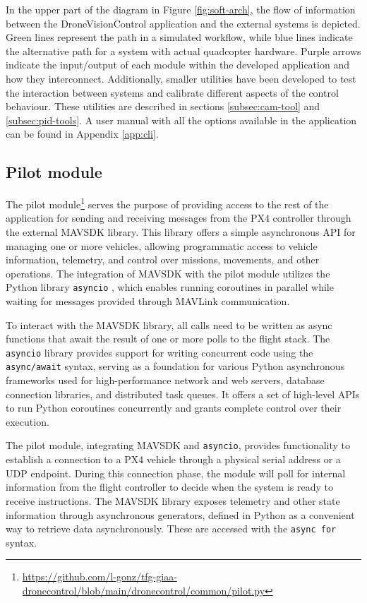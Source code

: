 In the upper part of the diagram in Figure \ref{fig:soft-arch}, the flow of information between the DroneVisionControl application and the external systems is depicted. Green lines represent the path in a simulated workflow, while blue lines indicate the alternative path for a system with actual quadcopter hardware. Purple arrows indicate the input/output of each module within the developed application and how they interconnect. Additionally, smaller utilities have been developed to test the interaction between systems and calibrate different aspects of the control behaviour. These utilities are described in sections \ref{subsec:cam-tool} and \ref{subsec:pid-tools}. A user manual with all the options available in the application can be found in Appendix \ref{app:cli}.

\subsection{Pilot module}
\label{subsec:pilot-module}

The pilot module\footnote{\url{https://github.com/l-gonz/tfg-giaa-dronecontrol/blob/main/dronecontrol/common/pilot.py}} serves the purpose of providing access to the rest of the application for sending and receiving messages from the PX4 controller through the external MAVSDK library. This library offers a simple asynchronous API for managing one or more vehicles, allowing programmatic access to vehicle information, telemetry, and control over missions, movements, and other operations. The integration of MAVSDK with the pilot module utilizes the Python library \texttt{asyncio} \cite{asyncio}, which enables running coroutines in parallel while waiting for messages provided through MAVLink communication.

To interact with the MAVSDK library, all calls need to be written as async functions that await the result of one or more polls to the flight stack. The \texttt{asyncio} library provides support for writing concurrent code using the \texttt{async/await} syntax, serving as a foundation for various Python asynchronous frameworks used for high-performance network and web servers, database connection libraries, and distributed task queues. It offers a set of high-level APIs to run Python coroutines concurrently and grants complete control over their execution.

The pilot module, integrating MAVSDK and \texttt{asyncio}, provides functionality to establish a connection to a PX4 vehicle through a physical serial address or a UDP endpoint.
During this connection phase, the module will poll for internal information from the flight controller to decide when the system is ready to receive instructions.
The MAVSDK library exposes telemetry and other state information through asynchronous generators, defined in Python as a convenient way to retrieve data asynchronously. These are accessed with the \texttt{async\ for} syntax.


